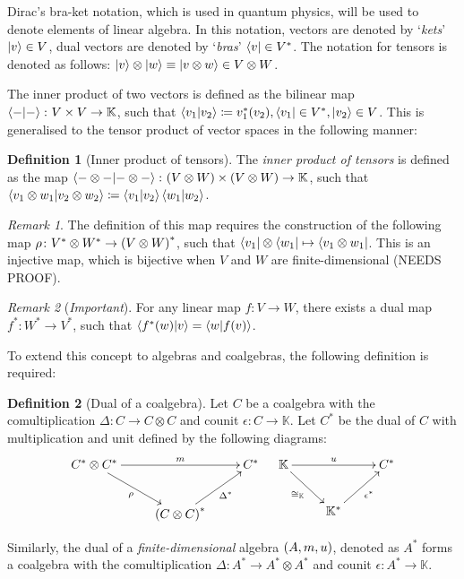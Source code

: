 \documentclass{article}
\theoremstyle{definition}
\newtheorem{Definition}{Definition}
\theoremstyle{remark}
\newtheorem*{Remark*}{Remark}
\theoremstyle{underline}
\theoremstyle{underline}
\begin{document}
	Dirac's bra-ket notation, which is used in quantum physics, will be used to denote elements of linear algebra. In this notation, vectors are denoted by `\emph{kets}' $\ket{v} \in V$, dual vectors are denoted by `\emph{bras}' $\bra{v} \in V^* $. The notation for tensors is denoted as follows: $\ket{v} \otimes \ket{w} \equiv \ket{v \otimes w} \in V \otimes W$.

	The inner product of two vectors is defined as the bilinear map $\braket{-}{-} \colon V \times V \to \mathbb K$, such that $\braket{v_1}{v_2} \coloneqq v_1^*(v_2), \bra{v_1} \in V^*, \ket{v_2} \in V$. This is generalised to the tensor product of vector spaces in the following manner:

	\begin{Definition}[Inner product of tensors]
		The \emph{inner product of tensors} is defined as the map $\braket{- \otimes -}{- \otimes -} \colon \pqty{V \otimes W} \times \pqty{V \otimes W} \to \mathbb K$, such that $ \braket{v_1 \otimes w_1}{v_2 \otimes w_2} \coloneqq \braket{v_1}{v_2}\braket{w_1}{w_2}$.
	\end{Definition} 

	\begin{Remark*}
		The definition of this map requires the construction of the following map $\rho \colon {V^* \otimes W^*} \to \pqty{V \otimes W}^*$, such that $\bra{v_1} \otimes \bra{w_1} \mapsto \bra{v_1 \otimes w_1}$. This is an injective map, which is bijective when $V$ and $W$ are finite-dimensional (NEEDS PROOF).
 	\end{Remark*}

 	\begin{Remark*}[\emph{Important}]
 		For any linear map $f \colon V \to W$, there exists a dual map $f^* \colon W^* \to V^*$, such that $\braket{f^*(w)}{v} = \braket{w}{f(v)}$.
 	\end{Remark*}

 	To extend this concept to algebras and coalgebras, the following definition is required:
 	
 	\begin{Definition}[Dual of a coalgebra]
 		Let $C$ be a coalgebra with the comultiplication $\Delta \colon C \to C \otimes C$ and counit $\epsilon \colon C \to \mathbb K$. Let $C^*$ be the dual of $C$ with multiplication and unit defined by the following diagrams:
 		\begin{align*}
			\xymatrix{
				C^* \otimes C^* \ar[rr]^-{m} \ar[rd]_-{\rho} & & C^* \\
				& \pqty{C \otimes C}^* \ar[ru]_-{\Delta^*}
			} & &
			\xymatrix{
				\mathbb K \ar[rr]^-{u} \ar[rd]_-{\cong_{\mathbb K}} & & C^* \\
				& \mathbb K^* \ar[ru]_-{\epsilon^*}
			}
		\end{align*}
 	\end{Definition}
 	Similarly, the dual of a \emph{finite-dimensional} algebra $\pqty{A, m, u}$, denoted as $A^*$ forms a coalgebra with the comultiplication $\Delta \colon A^* \to A^* \otimes A^*$ and counit $\epsilon \colon A^* \to \mathbb K$.
 	
\end{document}
